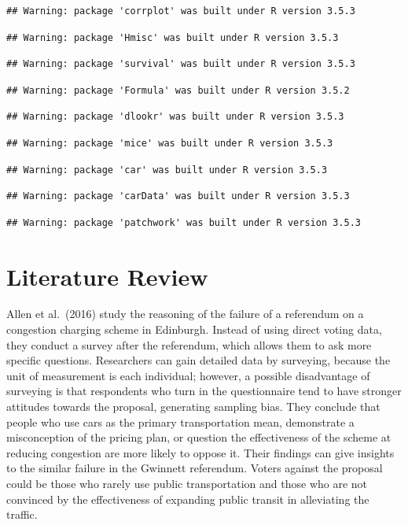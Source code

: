 \documentclass[
]{article}
\begin{document}
\begin{verbatim}
## Warning: package 'corrplot' was built under R version 3.5.3
\end{verbatim}

\begin{verbatim}
## Warning: package 'Hmisc' was built under R version 3.5.3
\end{verbatim}

\begin{verbatim}
## Warning: package 'survival' was built under R version 3.5.3
\end{verbatim}

\begin{verbatim}
## Warning: package 'Formula' was built under R version 3.5.2
\end{verbatim}

\begin{verbatim}
## Warning: package 'dlookr' was built under R version 3.5.3
\end{verbatim}

\begin{verbatim}
## Warning: package 'mice' was built under R version 3.5.3
\end{verbatim}

\begin{verbatim}
## Warning: package 'car' was built under R version 3.5.3
\end{verbatim}

\begin{verbatim}
## Warning: package 'carData' was built under R version 3.5.3
\end{verbatim}

\begin{verbatim}
## Warning: package 'patchwork' was built under R version 3.5.3
\end{verbatim}

\hypertarget{literature-review}{%
\section{Literature Review}\label{literature-review}}

Allen et al.~(2016) study the reasoning of the failure of a referendum
on a congestion charging scheme in Edinburgh. Instead of using direct
voting data, they conduct a survey after the referendum, which allows
them to ask more specific questions. Researchers can gain detailed data
by surveying, because the unit of measurement is each individual;
however, a possible disadvantage of surveying is that respondents who
turn in the questionnaire tend to have stronger attitudes towards the
proposal, generating sampling bias. They conclude that people who use
cars as the primary transportation mean, demonstrate a misconception of
the pricing plan, or question the effectiveness of the scheme at
reducing congestion are more likely to oppose it. Their findings can
give insights to the similar failure in the Gwinnett referendum. Voters
against the proposal could be those who rarely use public transportation
and those who are not convinced by the effectiveness of expanding public
transit in alleviating the traffic.
\end{document}
